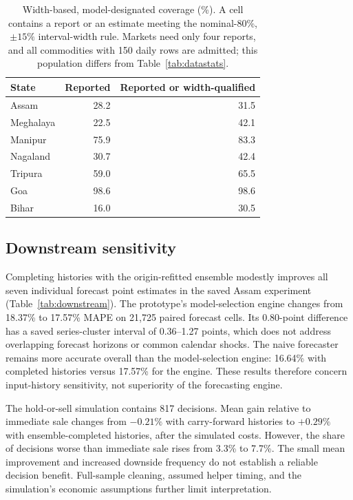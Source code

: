 \documentclass[sigconf,nonacm,balance=false]{acmart}
\begin{document}
\begin{table}[tbp]
\caption{Width-based, model-designated coverage (\%). A cell contains a report or an estimate meeting the nominal-80\%, $\pm15\%$ interval-width rule. Markets need only four reports, and all commodities with 150 daily rows are admitted; this population differs from Table~\ref{tab:datastats}.}
\label{tab:coverage}
\small
\begin{tabular}{lrr}
\toprule
State & Reported & Reported or width-qualified \\
\midrule
Assam & 28.2 & 31.5 \\
Meghalaya & 22.5 & 42.1 \\
Manipur & 75.9 & 83.3 \\
Nagaland & 30.7 & 42.4 \\
Tripura & 59.0 & 65.5 \\
Goa & 98.6 & 98.6 \\
Bihar & 16.0 & 30.5 \\
\bottomrule
\end{tabular}
\end{table}

\subsection{Downstream sensitivity}

Completing histories with the origin-refitted ensemble modestly improves all seven individual forecast point estimates in the saved Assam experiment (Table~\ref{tab:downstream}). The prototype's model-selection engine changes from 18.37\% to 17.57\% MAPE on 21,725 paired forecast cells. Its 0.80-point difference has a saved series-cluster interval of 0.36--1.27 points, which does not address overlapping forecast horizons or common calendar shocks. The naive forecaster remains more accurate overall than the model-selection engine: 16.64\% with completed histories versus 17.57\% for the engine. These results therefore concern input-history sensitivity, not superiority of the forecasting engine.



The hold-or-sell simulation contains 817 decisions. Mean gain relative to immediate sale changes from $-0.21\%$ with carry-forward histories to $+0.29\%$ with ensemble-completed histories, after the simulated costs. However, the share of decisions worse than immediate sale rises from 3.3\% to 7.7\%. The small mean improvement and increased downside frequency do not establish a reliable decision benefit. Full-sample cleaning, assumed helper timing, and the simulation's economic assumptions further limit interpretation.
\end{document}
